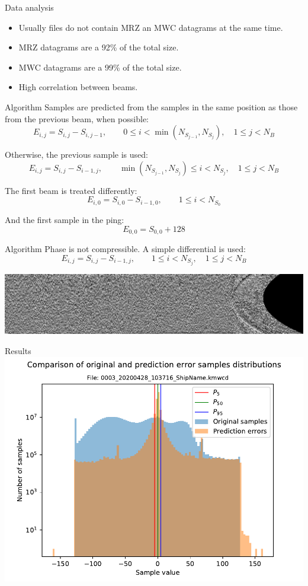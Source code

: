 \documentclass[usenames,dvipsnames]{beamer}
\begin{document}
\begin{frame}{Data analysis}
\begin{itemize}
	\item<1-> Usually files do not contain MRZ an MWC datagrams at the same time.
	\item<2-> MRZ datagrams are a 92\% of the total size.
	\item<2-> MWC datagrams are a 99\% of the total size.
	\item<3-> High correlation between beams.
\end{itemize}
\end{frame}

\begin{frame}{Algorithm}
Samples are predicted from the samples in the same position as those from the previous beam, when possible:
\[
E_{i,j} = S_{i,j} - S_{i,j-1}, \qquad 0 \leq i < \min(N_{S_{j-1}}, N_{S_j}), \quad 1 \leq j < N_B
\]

Otherwise, the previous sample is used:
\[
E_{i,j} = S_{i,j} - S_{i-1,j}, \qquad \min(N_{S_{j-1}}, N_{S_j}) \leq i < N_{S_j}, \quad 1 \leq j < N_B
\]

The first beam is treated differently:
\[
E_{i,0} = S_{i,0} - S_{i-1,0}, \qquad 1 \leq i < N_{S_0}
\]

And the first sample in the ping:
\[
E_{0,0} = S_{0,0} + 128
\]
\end{frame}

\begin{frame}{Algorithm}
Phase is not compressible. A simple differential is used:
\[
E_{i,j} = S_{i,j} - S_{i-1,j}, \qquad 1 \leq i < N_{S_j}, \quad 1 \leq j < N_B
\]

\includegraphics[scale=0.25]{graphics/water_column_ph.png}
\end{frame}

\begin{frame}{Results}
\centering
\includegraphics[scale=0.62]{graphics/0003_20200428_103716_ShipName.kmwcd_hist.pdf}
\end{frame}
\end{document}

